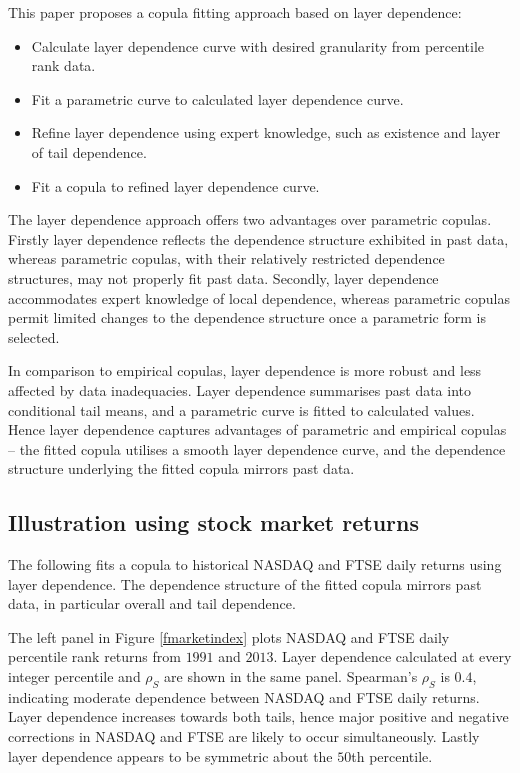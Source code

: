 \documentclass[authoryear]{elsarticle}
\newcommand{\fref}[1]{Figure \ref{#1}}
\begin{document}
This paper proposes a copula fitting approach based on layer dependence:
\begin{itemize}
\item Calculate layer dependence curve with desired granularity from percentile rank data.

\item Fit a parametric curve to calculated layer dependence curve.

\item Refine layer dependence using expert knowledge, such as existence and layer of tail dependence.

\item Fit a copula to refined layer dependence curve.
\end{itemize}
The layer dependence approach offers two advantages over parametric copulas. Firstly layer dependence reflects the dependence structure exhibited in past data, whereas parametric copulas, with their relatively restricted dependence structures, may not properly fit past data. Secondly, layer dependence accommodates expert knowledge of local dependence, whereas parametric copulas permit limited changes to the dependence structure once a parametric form is selected.

In comparison to empirical copulas, layer dependence is more robust and less affected by data inadequacies. Layer dependence summarises past data into conditional tail means, and a parametric curve is fitted to calculated values. Hence layer dependence captures advantages of parametric and empirical copulas -- the fitted copula utilises a smooth layer dependence curve, and the dependence structure underlying the fitted copula mirrors past data.



\subsection{Illustration using stock market returns}


The following fits a copula to historical NASDAQ and FTSE daily returns using layer dependence. The dependence structure of the fitted copula mirrors past data, in particular overall and tail dependence.

The left panel in \fref{fmarketindex} plots NASDAQ and FTSE daily percentile rank returns from $1991$ and $2013$. Layer dependence calculated at every integer percentile and  $\rho_S$ are shown in the same panel. Spearman's $\rho_S$ is $0.4$, indicating moderate dependence between NASDAQ and FTSE daily returns. Layer dependence increases towards both tails, hence major positive and negative corrections in NASDAQ and FTSE are likely to occur simultaneously. Lastly layer dependence appears to be symmetric about the $50$th percentile.
\end{document}
